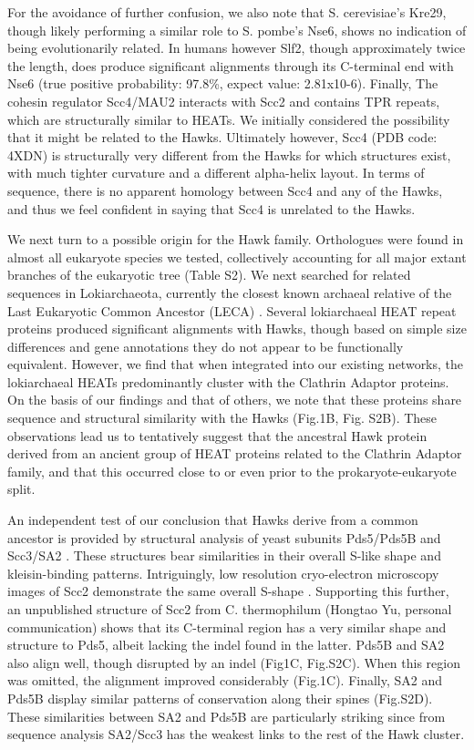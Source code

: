 \documentclass[a4paper,11pt,twoside,openright]{scrbook}
\let\cite\supercite
\begin{document}
For the avoidance of further confusion, we also note that S. cerevisiae’s Kre29, though likely performing a similar role to S. pombe’s Nse6, shows no indication of being evolutionarily related. In humans however Slf2, though approximately twice the length, does produce significant alignments through its C-terminal end with Nse6 (true positive probability: 97.8\%, expect value: 2.81x10-6). Finally, The cohesin regulator Scc4/MAU2 interacts with Scc2 and contains TPR repeats, which are structurally similar to HEATs. We initially considered the possibility that it might be related to the Hawks. Ultimately however, Scc4 (PDB code: 4XDN) is structurally very different from the Hawks for which structures exist, with much tighter curvature and a different alpha-helix layout. In terms of sequence, there is no apparent homology between Scc4 and any of the Hawks, and thus we feel confident in saying that Scc4 is unrelated to the Hawks.

We next turn to a possible origin for the Hawk family. Orthologues were found in almost all eukaryote species we tested, collectively accounting for all major extant branches of the eukaryotic tree (Table S2). We next searched for related sequences in Lokiarchaeota, currently the closest known archaeal relative of the Last Eukaryotic Common Ancestor \cite{Spang2015} (LECA) . Several lokiarchaeal HEAT repeat proteins produced significant alignments with Hawks, though based on simple size differences and gene annotations they do not appear to be functionally equivalent. However, we find that when integrated into our existing networks, the lokiarchaeal HEATs predominantly cluster with the Clathrin Adaptor proteins. On the basis of our findings and that of others, we note that these proteins share sequence and structural similarity with the Hawks \cite{Neuwald2000} (Fig.1B, Fig. S2B). These observations lead us to tentatively suggest that the ancestral Hawk protein derived from an ancient group of HEAT proteins related to the Clathrin Adaptor family, and that this occurred close to or even prior to the prokaryote-eukaryote split.

An independent test of our conclusion that Hawks derive from a common ancestor is provided by structural analysis of yeast subunits Pds5/Pds5B \cite{Hara2014} and Scc3/SA2 \cite{Ouyang2016}. These structures bear similarities in their overall S-like shape and kleisin-binding patterns. Intriguingly, low resolution cryo-electron microscopy images of Scc2 demonstrate the same overall S-shape \cite{Chao2015}. Supporting this further, an unpublished structure of Scc2 from C. thermophilum (Hongtao Yu, personal communication) shows that its C-terminal region has a very similar shape and structure to Pds5, albeit lacking the indel found in the latter. Pds5B and SA2 also align well, though disrupted by an indel \cite{Lee2016} (Fig1C, Fig.S2C). When this region was omitted, the alignment improved considerably (Fig.1C). Finally, SA2 and Pds5B display similar patterns of conservation along their spines (Fig.S2D). These similarities between SA2 and Pds5B are particularly striking since from sequence analysis SA2/Scc3 has the weakest links to the rest of the Hawk cluster.
\end{document}
